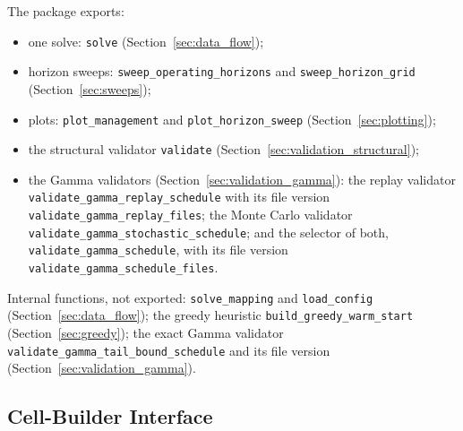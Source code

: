 The package exports:
\begin{itemize}[nosep]
  \item one solve: \texttt{solve} (Section~\ref{sec:data_flow});
  \item horizon sweeps: \texttt{sweep\_operating\_horizons} and \texttt{sweep\_horizon\_grid} (Section~\ref{sec:sweeps});
  \item plots: \texttt{plot\_management} and \texttt{plot\_horizon\_sweep} (Section~\ref{sec:plotting});
  \item the structural validator \texttt{validate} (Section~\ref{sec:validation_structural});
  \item the Gamma validators (Section~\ref{sec:validation_gamma}): the replay validator \texttt{validate\_gamma\_replay\_schedule} with its file version \texttt{validate\_gamma\_replay\_files}; the Monte Carlo validator \texttt{validate\_gamma\_stochastic\_schedule}; and the selector of both, \texttt{validate\_gamma\_schedule}, with its file version \texttt{validate\_gamma\_schedule\_files}.
\end{itemize}
Internal functions, not exported: \texttt{solve\_mapping} and \texttt{load\_config} (Section~\ref{sec:data_flow}); the greedy heuristic \texttt{build\_greedy\_warm\_start} (Section~\ref{sec:greedy}); the exact Gamma validator \texttt{validate\_gamma\_tail\_bound\_schedule} and its file version (Section~\ref{sec:validation_gamma}).

\subsection{Cell-Builder Interface}
\label{sec:builders}

